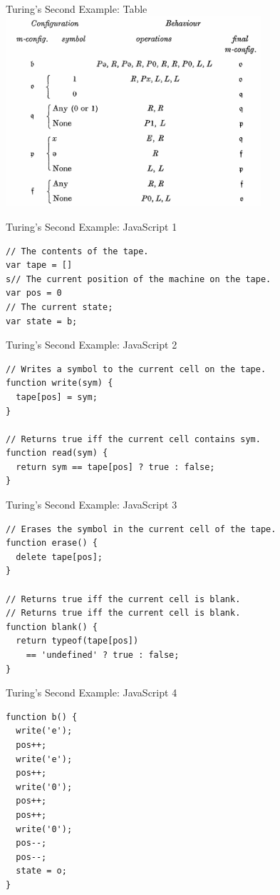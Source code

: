 \begin{frame}{Turing's Second Example: Table}
  \includegraphics[width=9.5cm]{img/turing-table-2.png}
\end{frame}

\begin{frame}[fragile]{Turing's Second Example: JavaScript 1}
\begin{verbatim}
// The contents of the tape.
var tape = []
s// The current position of the machine on the tape.
var pos = 0
// The current state;
var state = b;
\end{verbatim}
\end{frame}

\begin{frame}[fragile]{Turing's Second Example: JavaScript 2}
\begin{verbatim}
// Writes a symbol to the current cell on the tape.
function write(sym) {
  tape[pos] = sym;
}

// Returns true iff the current cell contains sym.
function read(sym) {
  return sym == tape[pos] ? true : false;
}
\end{verbatim}
\end{frame}

\begin{frame}[fragile]{Turing's Second Example: JavaScript 3}
\begin{verbatim}
// Erases the symbol in the current cell of the tape.
function erase() {
  delete tape[pos];
}

// Returns true iff the current cell is blank.
// Returns true iff the current cell is blank.
function blank() {
  return typeof(tape[pos])
    == 'undefined' ? true : false;
}
\end{verbatim}
\end{frame}

\begin{frame}[fragile]{Turing's Second Example: JavaScript 4}
\begin{verbatim}
function b() {
  write('e');
  pos++;
  write('e');
  pos++;
  write('0');
  pos++;
  pos++;
  write('0');
  pos--;
  pos--;
  state = o;
}
\end{verbatim}
\end{frame}

